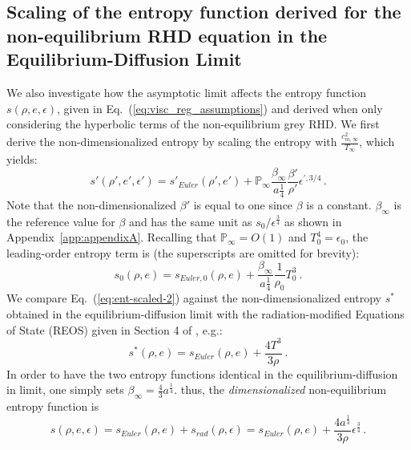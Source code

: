 \documentclass[review]{elsarticle}
\newcommand{\eqt}[1]{Eq.~(\ref{#1})}                     %
\newcommand{\app}[1]{Appendix~\ref{#1}}                     %
\renewcommand{\Re}{\textrm{Re}}
\renewcommand{\Re}{\mathbb{P}_\infty}
\newcommand{\tcr}[1]{\textcolor{red}{#1}}
\newcommand{\tcb}[1]{\textcolor{blue}{#1}}
\begin{document}
\subsection{Scaling of the entropy function derived for the non-equilibrium RHD equation in the Equilibrium-Diffusion Limit}\label{sect:ent-asym-limit}
%
We also investigate how the asymptotic limit affects the entropy function $s(\rho, e, \epsilon)$, given in \eqt{eq:visc_reg_assumptions} and derived when only considering the hyperbolic terms of the non-equilibrium grey RHD. We first derive the non-dimensionalized entropy by scaling the entropy with $\frac{c_{m,\infty}^2}{T_\infty}$, which yields:
%
\begin{equation}\label{eq:ent-scaled}
s' \left( \rho', e', \epsilon' \right) = s'_{Euler} \left( \rho', e' \right)+ \Re \frac{\beta_\infty}{a\frac{1}{4}} \frac{\beta'}{\rho'} \epsilon^{\prime,3/4} \,.
\end{equation}
%
Note that the non-dimensionalized $\beta'$ is equal to one since $\beta$ is a constant. $\beta_\infty$ is the reference value for $\beta$ and has the same unit as $s_0 / \epsilon^\frac{3}{4}$ as shown in \app{app:appendixA}. Recalling that $\Re = O(1)$ and $T_0^4 = \epsilon_0$, the leading-order entropy term is (the superscripts are omitted for brevity):
%
\begin{equation}\label{eq:ent-scaled-2}
s_0 \left( \rho, e \right) = s_{Euler,0}\left( \rho, e \right) + \frac{\beta_\infty}{a\frac{1}{4}} \frac{1}{\rho_0} T_0^3 \ .
\end{equation}
%
We compare \eqt{eq:ent-scaled-2} against the non-dimensionalized entropy $s^*$ obtained in the equilibrium-diffusion limit with the radiation-modified Equations of State (REOS) given in Section 4 of \cite{LowrieMorel}, e.g.:
%
\begin{equation}\label{eq:ent-reos}
s^*(\rho,e) = s_{Euler}(\rho,e) + \frac{4T^3}{3\rho} \ .
\end{equation}
%
In order to have the two entropy functions identical in the equilibrium-diffusion in limit, one simply sets $\beta_\infty = \frac{4}{3} a^\frac{1}{4}$. thus, the \emph{dimensionalized} non-equilibrium entropy function is 
%
\begin{equation}\label{eq:entropy}
s \left( \rho, e, \epsilon \right) = s_{Euler}\left( \rho, e \right) + s_{rad}(\rho,\epsilon)= s_{Euler}\left( \rho, e \right) + \frac{4a^\frac{1}{4}}{3\rho} \epsilon^\frac{3}{4} \,.
\end{equation}
\end{document}

